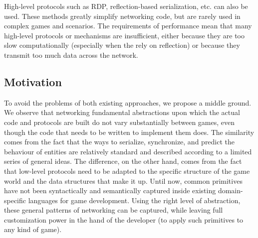 High-level protocols such as RDP, reflection-based serialization, etc. can also be used. These methods greatly simplify networking code, but are rarely used in complex games and scenarios. The requirements of performance mean that many high-level protocols or mechanisms are insufficient, either because they are too slow computationally (especially when the rely on reflection) or because they transmit too much data across the network.

\subsection{Motivation}

To avoid the problems of both existing approaches, we propose a middle ground. We observe that networking fundamental abstractions upon which the actual code and protocols are built do not vary substantially between games, even though the code that needs to be written to implement them does. The similarity comes from the fact that the ways to serialize, synchronize, and predict the behaviour of entities are relatively standard and described according to a limited series of general ideas. The difference, on the other hand, comes from the fact that low-level protocols need to be adapted to the specific structure of the game world and the data structures that make it up. Until now, common primitives have not been syntactically and semantically captured inside existing domain-specific languages for game development\cite{bhatti2009domain}. Using the right level of abstraction, these general patterns of networking can be captured, while leaving full customization power in the hand of the developer (to apply such primitives to any kind of game).

